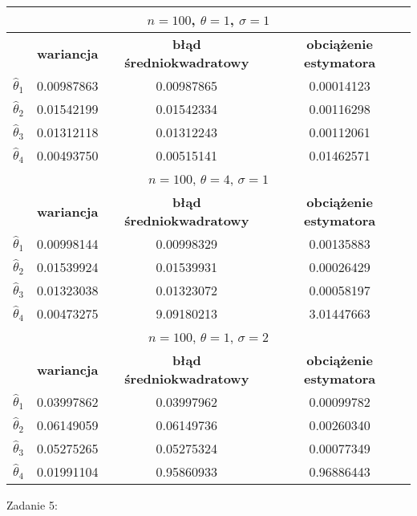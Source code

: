 \documentclass[a4paper]{article}
\begin{document}
\begin{table}[H]
\centering
\begin{tabular}{|c|c|c|c|}
\hline
\multicolumn{4}{|c|}{$n=100$, $\theta=1$, $\sigma=1$} \\ \hline
                  & \textbf{wariancja}   & \textbf{błąd średniokwadratowy} & \textbf{obciążenie estymatora} \\ \hline
$\hat{\theta}_1$ & 0.00987863 & 0.00987865 & 0.00014123 \\ \hline
$\hat{\theta}_2$ & 0.01542199 & 0.01542334 & 0.00116298 \\ \hline
$\hat{\theta}_3$ & 0.01312118 & 0.01312243 & 0.00112061 \\ \hline
$\hat{\theta}_4$ & 0.00493750 & 0.00515141 & 0.01462571 \\ \hline

\multicolumn{4}{|c|}{$n=100$, $\theta=4$, $\sigma=1$} \\ \hline
                  & \textbf{wariancja}   & \textbf{błąd średniokwadratowy} & \textbf{obciążenie estymatora} \\ \hline
$\hat{\theta}_1$ & 0.00998144 & 0.00998329 & 0.00135883 \\ \hline
$\hat{\theta}_2$ & 0.01539924 & 0.01539931 & 0.00026429 \\ \hline
$\hat{\theta}_3$ & 0.01323038 & 0.01323072 & 0.00058197 \\ \hline
$\hat{\theta}_4$ & 0.00473275 & 9.09180213 & 3.01447663 \\ \hline

\multicolumn{4}{|c|}{$n=100$, $\theta=1$, $\sigma=2$} \\ \hline
                  & \textbf{wariancja}   & \textbf{błąd średniokwadratowy} & \textbf{obciążenie estymatora} \\ \hline
$\hat{\theta}_1$ & 0.03997862 & 0.03997962 & 0.00099782 \\ \hline
$\hat{\theta}_2$ & 0.06149059 & 0.06149736 & 0.00260340 \\ \hline
$\hat{\theta}_3$ & 0.05275265 & 0.05275324 & 0.00077349 \\ \hline
$\hat{\theta}_4$ & 0.01991104 & 0.95860933 & 0.96886443 \\ \hline
\end{tabular}
\end{table}

Zadanie 5:
\end{document}
